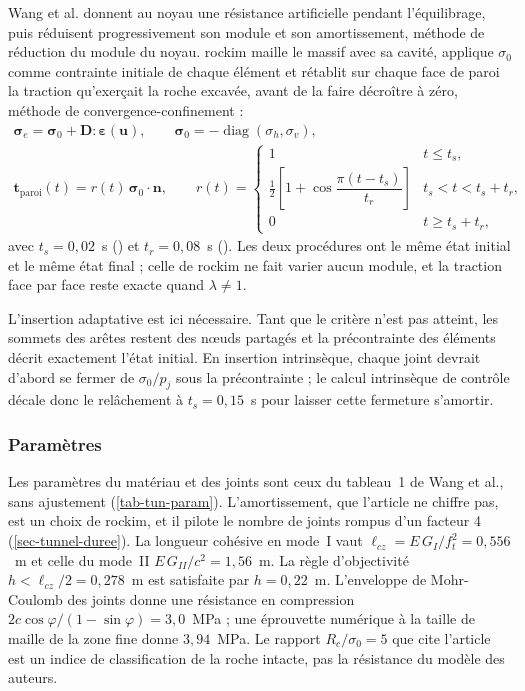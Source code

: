 Wang et al. donnent au noyau une résistance artificielle pendant l'équilibrage, puis réduisent progressivement son module et son amortissement, méthode de réduction du module du noyau. rockim maille le massif avec sa cavité, applique $\sigma_0$ comme contrainte initiale de chaque élément et rétablit sur chaque face de paroi la traction qu'exerçait la roche excavée, avant de la faire décroître à zéro, méthode de convergence-confinement :
\begin{gather}
\boldsymbol\sigma_e = \boldsymbol\sigma_0 + \mathbf D:\boldsymbol\varepsilon(\mathbf u), \qquad \boldsymbol\sigma_0 = -\operatorname{diag}(\sigma_h, \sigma_v), \label{eq-tun-insitu}\\
\mathbf t_\text{paroi}(t) = r(t)\,\boldsymbol\sigma_0\cdot\mathbf n, \qquad
r(t) = \begin{cases} 1 & t \leq t_s, \\ \tfrac12\left[1 + \cos\dfrac{\pi(t - t_s)}{t_r}\right] & t_s < t < t_s + t_r, \\ 0 & t \geq t_s + t_r, \end{cases} \label{eq-tun-relache}
\end{gather}
avec $t_s = 0{,}02$~s () et $t_r = 0{,}08$~s (). Les deux procédures ont le même état initial et le même état final ; celle de rockim ne fait varier aucun module, et la traction face par face reste exacte quand $\lambda \neq 1$.

L'insertion adaptative est ici nécessaire. Tant que le critère n'est pas atteint, les sommets des arêtes restent des nœuds partagés et la précontrainte des éléments décrit exactement l'état initial. En insertion intrinsèque, chaque joint devrait d'abord se fermer de $\sigma_0/p_j$ sous la précontrainte ; le calcul intrinsèque de contrôle décale donc le relâchement à $t_s = 0{,}15$~s pour laisser cette fermeture s'amortir.

\subsubsection{Paramètres}

Les paramètres du matériau et des joints sont ceux du tableau~1 de Wang et al., sans ajustement (\cref{tab-tun-param}). L'amortissement, que l'article ne chiffre pas, est un choix de rockim, et il pilote le nombre de joints rompus d'un facteur 4 (\cref{sec-tunnel-duree}). La longueur cohésive en mode~I vaut $\ell_{cz} = E\,G_I/f_t^2 = 0{,}556$~m et celle du mode~II $E\,G_{II}/c^2 = 1{,}56$~m. La règle d'objectivité $h < \ell_{cz}/2 = 0{,}278$~m est satisfaite par $h = 0{,}22$~m. L'enveloppe de Mohr-Coulomb des joints donne une résistance en compression $2c\cos\varphi/(1 - \sin\varphi) = 3{,}0$~MPa ; une éprouvette numérique à la taille de maille de la zone fine donne $3{,}94$~MPa. Le rapport $R_c/\sigma_0 = 5$ que cite l'article est un indice de classification de la roche intacte, pas la résistance du modèle des auteurs.

